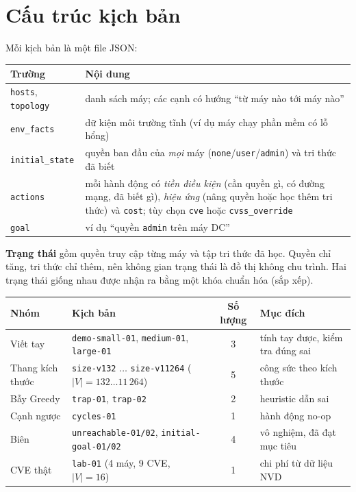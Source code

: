 \documentclass[11pt,a4paper]{article}
\newcommand{\V}{|V|}
\begin{document}
\section{Cấu trúc kịch bản}
\label{sec:structure}

Mỗi kịch bản là một file JSON:

\begin{center}\small
\begin{tabular}{@{}lY{12.2cm}@{}}
\toprule
Trường & Nội dung \\
\midrule
\texttt{hosts}, \texttt{topology} & danh sách máy; các cạnh có hướng ``từ máy nào tới máy nào'' \\
\texttt{env\_facts} & dữ kiện môi trường tĩnh (ví dụ máy chạy phần mềm có lỗ hổng) \\
\texttt{initial\_state} & quyền ban đầu của \emph{mọi} máy (\texttt{none}/\texttt{user}/\texttt{admin}) và tri thức đã biết \\
\texttt{actions} & mỗi hành động có \emph{tiền điều kiện} (cần quyền gì, có đường mạng, đã biết gì), \emph{hiệu ứng} (nâng quyền hoặc học thêm tri thức) và \texttt{cost}; tùy chọn \texttt{cve} hoặc \texttt{cvss\_override} \\
\texttt{goal} & ví dụ ``quyền \texttt{admin} trên máy DC'' \\
\bottomrule
\end{tabular}
\end{center}

\textbf{Trạng thái} gồm quyền truy cập từng máy và tập tri thức đã học. Quyền chỉ tăng, tri thức chỉ thêm, nên không gian trạng thái là đồ thị không chu trình. Hai trạng thái giống nhau được nhận ra bằng một khóa chuẩn hóa (sắp xếp).

\begin{center}\small
\begin{tabular}{@{}Y{3.0cm}Y{6.3cm}cY{3.1cm}@{}}
\toprule
Nhóm & Kịch bản & Số lượng & Mục đích \\
\midrule
Viết tay & \texttt{demo-small-01}, \texttt{medium-01}, \texttt{large-01} & 3 & tính tay được, kiểm tra đúng sai \\
Thang kích thước & \texttt{size-v132} $\ldots$ \texttt{size-v11264} ($\V=132\ldots11\,264$) & 5 & công sức theo kích thước \\
Bẫy Greedy & \texttt{trap-01}, \texttt{trap-02} & 2 & heuristic dẫn sai \\
Cạnh ngược & \texttt{cycles-01} & 1 & hành động no-op \\
Biên & \texttt{unreachable-01/02}, \texttt{initial-goal-01/02} & 4 & vô nghiệm, đã đạt mục tiêu \\
CVE thật & \texttt{lab-01} (4 máy, 9 CVE, $\V=16$) & 1 & chi phí từ dữ liệu NVD \\
\bottomrule
\end{tabular}
\end{center}
\end{document}
